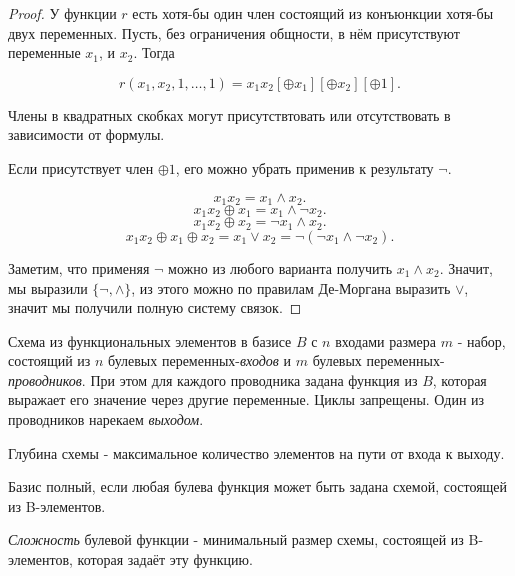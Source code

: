\begin{theorem}
\begin{proof}
        У функции $r$ есть хотя-бы один член состоящий из конъюнкции хотя-бы двух переменных. Пусть, без ограничения общности, в нём присутствуют переменные $x_1$, и $x_2$. Тогда

        \[ r(x_1, x_2, 1, \ldots, 1) = x_1x_2[\oplus x_1][\oplus x_2][\oplus 1] .\]

        Члены в квадратных скобках могут присутствтовать или отсутствовать в зависимости от формулы.

        Если присутствует член $\oplus 1$, его можно убрать применив к результату $\neg$.

        \[ x_1x_2 = x_1 \land x_2 .\]
        \[ x_1x_2\oplus x_1 = x_1 \land \neg x_2 .\] 
        \[ x_1x_2\oplus x_2 = \neg x_1 \land x_2 .\] 
        \[ x_1x_2\oplus x_1\oplus x_2 = x_1 \lor x_2 = \neg \left( \neg x_1 \land \neg x_2 \right)  .\]

        Заметим, что применяя $\neg$ можно из любого варианта получить $x_1 \land x_2$. Значит, мы выразили $\{\neg, \land\}$, из этого можно по правилам Де-Моргана выразить $\lor$, значит мы получили полную систему связок. 
    \end{proof}
\end{theorem}

\begin{definition} \thmslashn
	
	Схема из функциональных элементов в базисе $B$  с $n$ входами размера $m$ - набор, состоящий из 
	$n$ булевых переменных-\textit{входов} и 
	$m$ булевых переменных-\textit{проводников}. 
	При этом для каждого проводника задана функция из $B$, 
	которая выражает его значение через другие переменные. 
	Циклы запрещены. 
	Один из проводников нарекаем \textit{выходом}.
\end{definition}
\begin{definition} \thmslashn

	Глубина схемы - максимальное количество элементов на пути от входа к выходу.
\end{definition}
\begin{definition} \thmslashn

	Базис полный, если любая булева функция может быть задана схемой, состоящей из B-элементов.
\end{definition}

\begin{definition} \thmslashn

	\textit{Сложность} булевой функции - минимальный размер схемы, состоящей из B-элементов, которая задаёт эту функцию.
\end{definition}

